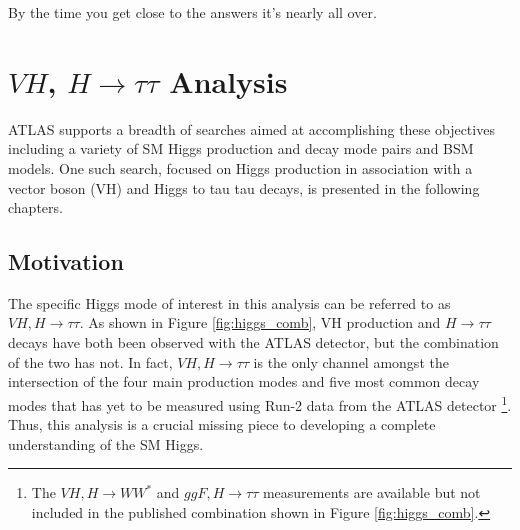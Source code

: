 \begin{savequote}[75mm]
By the time you get close to the answers it's nearly all over.
\end{savequote}

\chapter{$VH$, $H\rightarrow \tau\tau$ Analysis}

 ATLAS supports a breadth of searches aimed at accomplishing these objectives including a variety of SM Higgs production and decay mode pairs and BSM models. One such search, focused on Higgs production in association with a vector boson (VH) and Higgs to tau tau decays, is presented in the following chapters.

\section{Motivation}
The specific Higgs mode of interest in this analysis can be referred to as $VH, H\rightarrow\tau\tau$. As shown in Figure \ref{fig:higgs_comb}, VH production and $H\rightarrow \tau\tau$ decays have both been observed  with the ATLAS detector, but the combination of the two has not. In fact, $VH,H\rightarrow\tau\tau$ is the only channel amongst the intersection of the four main production modes and five most common decay modes that has yet to be measured using Run-2 data from the ATLAS detector \cite{higgs_comb_paper}\footnote{The $VH,H\rightarrow WW^*$\cite{vh_hww_run2} and $ggF,H\rightarrow\tau\tau$\cite{htautau_run2} measurements are available but not included in the published combination shown in Figure \ref{fig:higgs_comb}.}. Thus, this analysis is a crucial missing piece to developing a complete understanding of the SM Higgs.\\

